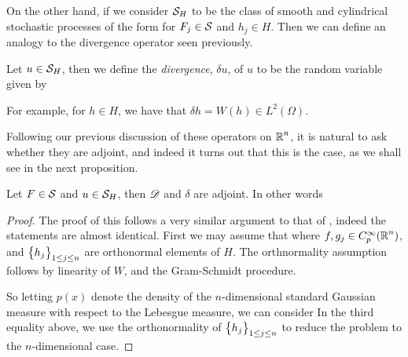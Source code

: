 \documentclass[../main.tex]{subfiles}
\begin{document}
On the other hand, if we consider $\S_H$ to be the class of smooth and cylindrical stochastic processes of the form  for $F_j\in \S$ and $h_j\in H$. Then we can define an analogy to the divergence operator seen previously.
\begin{definition}
\label{def:Mall_div}
Let $u\in \S_H$, then we define the \emph{divergence}, $\delta u$, of $u$ to be the random variable given by 
\end{definition}
For example, for $h\in H$, we have that $\delta h = W(h)\in L^2(\Omega)$.

Following our previous discussion of these operators on $\R^n$, it is natural to ask whether they are adjoint, and indeed it turns out that this is the case, as we shall see in the next proposition.
\begin{proposition}
\label{prop:Mall_adjoint}
Let $F\in\S$ and $u\in\S_H$, then $\Dif$ and $\delta$ are adjoint. In other words 
\end{proposition}
\begin{proof}
The proof of this follows a very similar argument to that of , indeed the statements are almost identical. First we may assume that  where $f,g_j\in C_p^\infty(\R^n)$, and $\cbr{h_j}_{1\leq j\leq n}$ are orthonormal elements of $H$. The orthnormality assumption follows by linearity of $W$, and the Gram-Schmidt procedure.

So letting $p(x)$ denote the density of the $n$-dimensional standard Gaussian measure with respect to the Lebesgue measure, we can consider  In the third equality above, we use the orthonormality of $\cbr{h_j}_{1\leq j\leq n}$ to reduce the problem to the $n$-dimensional case.
\end{proof}
\end{document}
